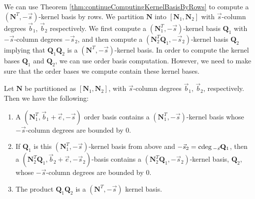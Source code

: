 We can use Theorem \ref{thm:continueComputingKernelBasisByRows} to
compute a $\left(\mathbf{N}^{T},-\vec{s}\right)$-kernel basis by
rows. We partition $\mathbf{N}$ into $\left[\mathbf{N}_{1},\mathbf{N}_{2}\right]$
with $\vec{s}$-column degrees $\vec{b}_{1}$, $\vec{b}_{2}$ respectively.
We first compute a $\left(\mathbf{N}_{1}^{T},-\vec{s}\right)$-kernel
basis $\mathbf{Q}_{1}$ with $-\vec{s}$-column degrees $-\vec{s}_{2}$,
and then compute a $\left(\mathbf{N}_{2}^{T}\mathbf{Q}_{1},-\vec{s}_{2}\right)$-kernel
basis $\mathbf{Q}_{2}$ implying that $\mathbf{Q}_{1}\mathbf{Q}_{2}$
is a $\left(\mathbf{N}^{T},-\vec{s}\right)$-kernel basis. In order
to compute the kernel bases $\mathbf{Q}_{1}$ and $\mathbf{Q}_{2}$,
we can use order basis computation. However, we need to make sure
that the order bases we compute contain these kernel bases.
\begin{lem}
\label{lem:kernelBasisOfSubsetOfRowsContainedInOrderBasis} Let $\mathbf{N}$
be partitioned as $\left[\mathbf{N}_{1},\mathbf{N}_{2}\right]$, with
$\vec{s}$-column degrees $\vec{b}_{1}$, $\vec{b}_{2}$, respectively.
Then we have the following:
\begin{enumerate}
\item A $\left(\mathbf{N}_{1}^{T},\vec{b}_{1}+\vec{e},-\vec{s}\right)$
order basis contains a $\left(\mathbf{N}_{1}^{T},-\vec{s}\right)$-kernel
basis whose $-\vec{s}$-column degrees are bounded by $0$. 
\item If $\mathbf{Q}_{1}$ is this $\left(\mathbf{N}_{1}^{T},-\vec{s}\right)$-kernel
basis from above and $-\vec{s}_{2}={\rm cdeg}\,_{-\vec{s}}\mathbf{Q}_{1}$,
then a $\left(\mathbf{N}_{2}^{T}\mathbf{Q}_{1},\vec{b}_{2}+\vec{e},-\vec{s}_{2}\right)$-basis
contains a $\left(\mathbf{N}_{2}^{T}\mathbf{Q}_{1},-\vec{s}_{2}\right)$-kernel
basis, $\mathbf{Q}_{2}$, whose $-\vec{s}$-column degrees are bounded
by $0$. 
\item The product $\mathbf{Q}_{1}\mathbf{Q}_{2}$ is a $\left(\mathbf{N}^{T},-\vec{s}\right)$
kernel basis. 
\end{enumerate}
\end{lem}
